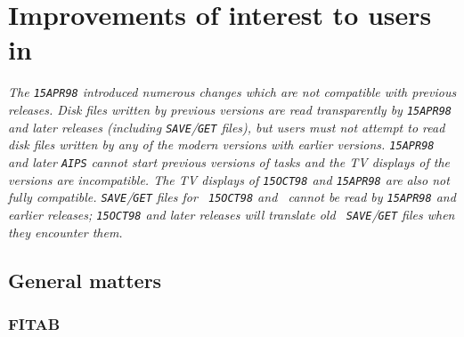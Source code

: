 \vfill\eject

\section{Improvements of interest to users in \RELEASENAME}

\emph{The {\tt 15APR98} introduced numerous changes which are not
compatible with previous releases.  Disk files written by previous
versions are read transparently by {\tt 15APR98} and later releases
(including {\tt SAVE}/{\tt GET} files), but users must not attempt to
read disk files written by any of the modern versions with earlier
versions.  {\tt 15APR98} and later {\tt AIPS} cannot start previous
versions of tasks and the TV displays of the versions are
incompatible.  The TV displays of {\tt 15OCT98} and {\tt 15APR98} are
also not fully compatible.  {\tt SAVE}/{\tt GET} files for {\tt
15OCT98} and \RELEASENAME\ cannot be read by {\tt 15APR98} and earlier
releases; {\tt 15OCT98} and later releases will translate old {\tt
SAVE}/{\tt GET} files when they encounter them.}

\subsection{General matters}

\subsubsection{FITAB}

